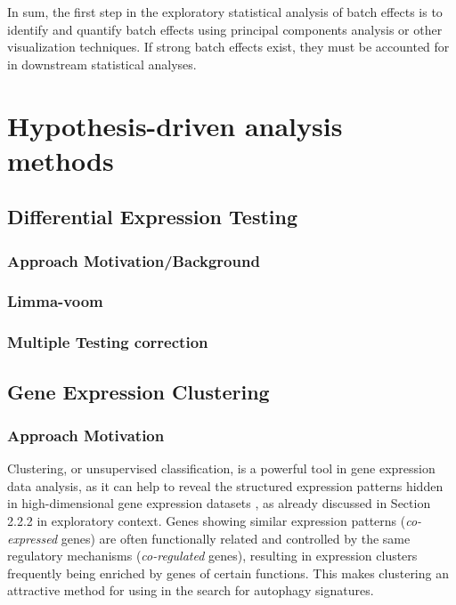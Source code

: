 In sum, the first step in the exploratory statistical analysis of batch effects is to identify and quantify batch effects using principal components analysis or other visualization techniques. If strong batch effects exist, they must be accounted for in downstream statistical analyses. 

 


\section{Hypothesis-driven analysis methods}    


    \subsection{Differential Expression Testing}
    

        \subsubsection{Approach Motivation/Background}
        \subsubsection{Limma-voom}
        \subsubsection{Multiple Testing correction}



    \newpage
    \subsection{Gene Expression Clustering}
    
 
\subsubsection{Approach Motivation}
Clustering, or unsupervised classification,  is a powerful tool in gene expression data analysis, as it can help to reveal the structured expression patterns hidden in high-dimensional gene expression datasets \cite{Kumar2007Mfuzz:Data}, as already discussed in Section 2.2.2 in exploratory context. Genes showing similar expression patterns (\textit{co-expressed} genes) are often functionally related and controlled by the same regulatory mechanisms (\textit{co-regulated} genes), resulting in expression clusters frequently being enriched by genes of certain functions. This makes clustering an attractive method for using in the search for autophagy signatures. 
 

